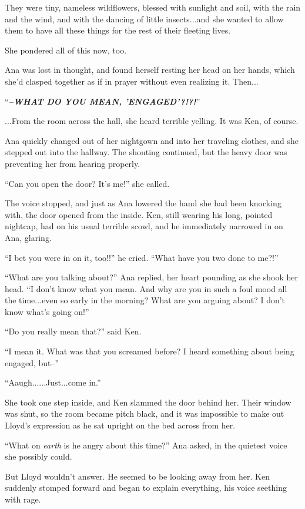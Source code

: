 \documentclass[
]{article}
\begin{document}
They were tiny, nameless wildflowers, blessed with sunlight and soil,
with the rain and the wind, and with the dancing of little insects...and
she wanted to allow them to have all these things for the rest of their
fleeting lives.

She pondered all of this now, too.

Ana was lost in thought, and found herself resting her head on her
hands, which she'd clasped together as if in prayer without even
realizing it. Then...

``\emph{\textbf{--WHAT DO YOU MEAN, 'ENGAGED'?!?!}}''

...From the room across the hall, she heard terrible yelling. It was
Ken, of course.

Ana quickly changed out of her nightgown and into her traveling clothes,
and she stepped out into the hallway. The shouting continued, but the
heavy door was preventing her from hearing properly.

``Can you open the door? It's me!'' she called.

The voice stopped, and just as Ana lowered the hand she had been
knocking with, the door opened from the inside. Ken, still wearing his
long, pointed nightcap, had on his usual terrible scowl, and he
immediately narrowed in on Ana, glaring.

``I bet you were in on it, too!!'' he cried. ``What have you two done to
me?!''

``What are you talking about?'' Ana replied, her heart pounding as she
shook her head. ``I don't know what you mean. And why are you in such a
foul mood all the time...even so early in the morning? What are you
arguing about? I don't know what's going on!''

``Do you really mean that?'' said Ken.

``I mean it. What was that you screamed before? I heard something about
being engaged, but--''

``Aaugh......Just...come in.''

She took one step inside, and Ken slammed the door behind her. Their
window was shut, so the room became pitch black, and it was impossible
to make out Lloyd's expression as he sat upright on the bed across from
her.

``What on \emph{earth} is he angry about this time?'' Ana asked, in the
quietest voice she possibly could.

But Lloyd wouldn't answer. He seemed to be looking away from her. Ken
suddenly stomped forward and began to explain everything, his voice
seething with rage.
\end{document}
